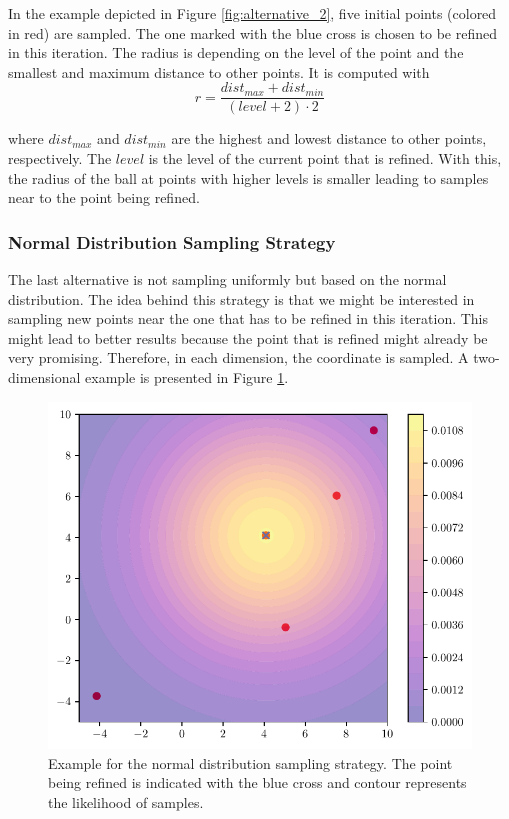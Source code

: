 In the example depicted in Figure \ref{fig:alternative_2}, five initial points (colored in red) are sampled. The one marked with the blue cross is chosen to be refined in this iteration. The radius is depending on the level of the point and the smallest and maximum distance to other points. It is computed with
\begin{equation}
	r = \frac{dist_{max} + dist_{min}}{(level+2)\cdot 2}
\end{equation}

where $ dist_{max} $ and $ dist_{min} $ are the highest and lowest distance to other points, respectively. The $ level $ is the level of the current point that is refined. With this, the radius of the ball at points with higher levels is smaller leading to samples near to the point being refined.

\subsubsection{Normal Distribution Sampling Strategy}

The last alternative is not sampling uniformly but based on the normal distribution. The idea behind this strategy is that we might be interested in sampling new points near the one that has to be refined in this iteration. This might lead to better results because the point that is refined might already be very promising. Therefore, in each dimension, the coordinate is sampled. A two-dimensional example is presented in Figure \ref{fig:alternative_3}.

\begin{figure}[H]
	\centering
	\includegraphics[scale=0.8]{figures/Adaptive_random/Visualizations/Alternative_3}
	\caption{ Example for the normal distribution sampling strategy. The point being refined is indicated with the blue cross and contour represents the likelihood of samples. }
	\label{fig:alternative_3}
\end{figure}

